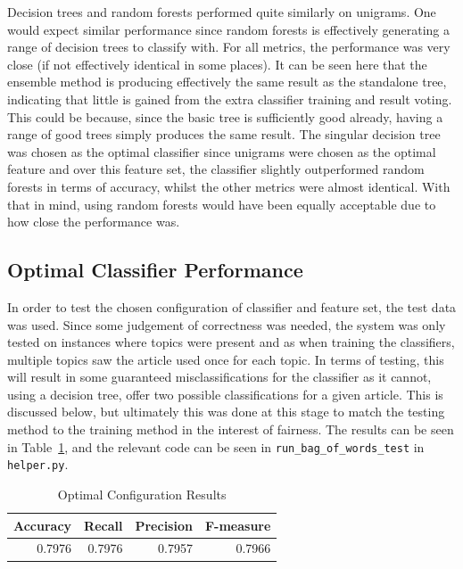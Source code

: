\documentclass[11pt]{article}
\begin{document}
Decision trees and random forests performed quite similarly on unigrams. One would expect similar performance since random forests is effectively generating a range of decision trees to classify with. For all metrics, the performance was very close (if not effectively identical in some places). It can be seen here that the ensemble method is producing effectively the same result as the standalone tree, indicating that little is gained from the extra classifier training and result voting. This could be because, since the basic tree is sufficiently good already, having a range of good trees simply produces the same result. The singular decision tree was chosen as the optimal classifier since unigrams were chosen as the optimal feature and over this feature set, the classifier slightly outperformed random forests in terms of accuracy, whilst the other metrics were almost identical. With that in mind, using random forests would have been equally acceptable due to how close the performance was. 

\subsection{Optimal Classifier Performance}
In order to test the chosen configuration of classifier and feature set, the test data was used. Since some judgement of correctness was needed, the system was only tested on instances where topics were present and as when training the classifiers, multiple topics saw the article used once for each topic. In terms of testing, this will result in some guaranteed misclassifications for the classifier as it cannot, using a decision tree, offer two possible classifications for a given article. This is discussed below, but ultimately this was done at this stage to match the testing method to the training method in the interest of fairness. The results can be seen in Table~\ref{tab:opt}, and the relevant code can be seen in \texttt{run\_bag\_of\_words\_test} in \texttt{helper.py}.

\begin{table}[htbp]
  \centering
  \caption{Optimal Configuration Results}
    \begin{tabular}{rrrr}
    \toprule
    Accuracy & Recall & Precision & F-measure \\
    \midrule
    0.7976 & 0.7976 & 0.7957 & 0.7966 \\
    \bottomrule
    \end{tabular}%
  \label{tab:opt}%
\end{table}%
\end{document}
